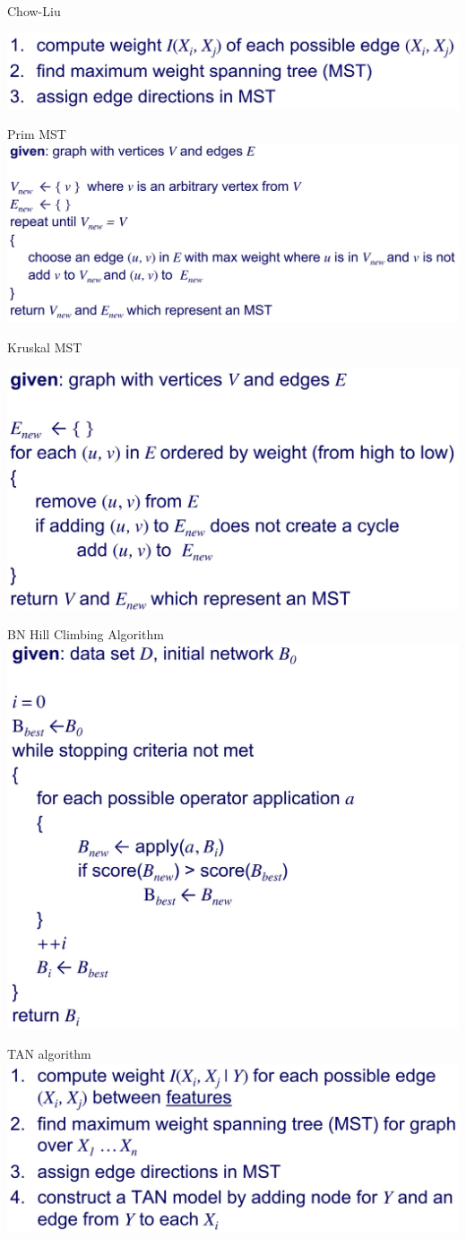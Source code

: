 \documentclass[10pt,landscape]{article}
\begin{document}
\begin{multicols}{4}
    Chow-Liu

    \includegraphics[width=0.7\linewidth]{snips/10_chow-liu.jpg}
    
    Prim MST
    \includegraphics[width=0.9\linewidth]{snips/11_prim-mst.jpg}
    
    Kruskal MST

    \includegraphics[width=0.7\linewidth]{snips/12_kruskal-mst.jpg}
    
    BN Hill Climbing Algorithm
    \includegraphics[width=0.7\linewidth]{snips/13_bn-hill-climb.jpg}
    
    TAN algorithm
    \includegraphics[width=0.7\linewidth]{snips/14_tan.jpg}
    

\end{multicols}
\end{document}
